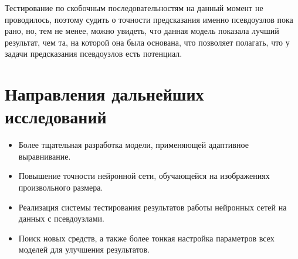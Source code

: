 \documentclass[14pt]{matmex-diploma-custom}
\begin{document}


Тестирование по скобочным последовательностям на данный момент не проводилось, поэтому судить о точности предсказания именно псевдоузлов пока рано, но, тем не менее, можно увидеть, что данная модель показала лучший результат, чем та, на которой она была основана, что позволяет полагать, что у задачи предсказания псевдоузлов есть потенциал.

\section{Направления дальнейших исследований}
\begin{itemize}
    \item Более тщательная разработка модели, применяющей адаптивное выравнивание.
    \item Повышение точности нейронной сети, обучающейся на изображениях произвольного размера.
    \item Реализация системы тестирования результатов работы нейронных сетей на данных с псевдоузлами.
    \item Поиск новых средств, а также более тонкая настройка параметров всех моделей для улучшения результатов.
\end{itemize}

\setmonofont[Mapping=tex-text]{CMU Typewriter Text}

\renewcommand\refname{Список литературы}

\end{document}
